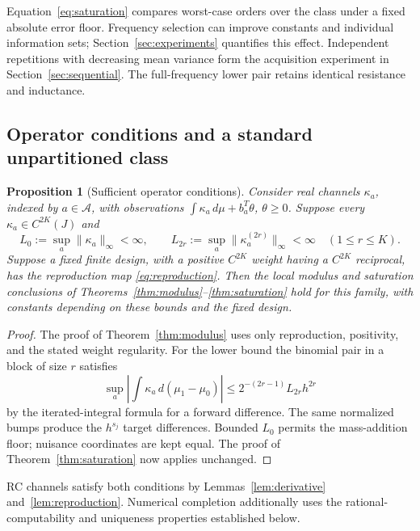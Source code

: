 \documentclass[10pt]{amsart}
\newtheorem{proposition}[theorem]{Proposition}
\theoremstyle{definition}
\theoremstyle{remark}
\theoremstyle{plain}
\newcommand{\dd}{\,d}
\begin{document}
Equation~\eqref{eq:saturation} compares worst-case orders over the class under a fixed absolute error floor. Frequency selection can improve constants and individual information sets; Section~\ref{sec:experiments} quantifies this effect. Independent repetitions with decreasing mean variance form the acquisition experiment in Section~\ref{sec:sequential}. The full-frequency lower pair retains identical resistance and inductance.

\subsection{Operator conditions and a standard unpartitioned class}
\begin{proposition}[Sufficient operator conditions]\label{prop:operator}
Consider real channels $\kappa_a$, indexed by $a\in\mathcal A$, with observations $\int\kappa_a\dd\mu+b_a^T\theta$, $\theta\ge0$. Suppose every $\kappa_a\in C^{2K}(J)$ and
\[
 L_0:=\sup_a\|\kappa_a\|_\infty<\infty,\qquad
 L_{2r}:=\sup_a\|\kappa_a^{(2r)}\|_\infty<\infty\quad(1\le r\le K).
\]
Suppose a fixed finite design, with a positive $C^{2K}$ weight having a $C^{2K}$ reciprocal, has the reproduction map \eqref{eq:reproduction}. Then the local modulus and saturation conclusions of Theorems~\ref{thm:modulus}--\ref{thm:saturation} hold for this family, with constants depending on these bounds and the fixed design.
\end{proposition}
\begin{proof}
The proof of Theorem~\ref{thm:modulus} uses only reproduction, positivity, and the stated weight regularity. For the lower bound the binomial pair in a block of size $r$ satisfies
\[
 \sup_a\left|\int\kappa_a\dd(\mu_1-\mu_0)\right|
 \le 2^{-(2r-1)}L_{2r}h^{2r}
\]
by the iterated-integral formula for a forward difference. The same normalized bumps produce the $h^{s_j}$ target differences. Bounded $L_0$ permits the mass-addition floor; nuisance coordinates are kept equal. The proof of Theorem~\ref{thm:saturation} now applies unchanged.
\end{proof}
RC channels satisfy both conditions by Lemmas~\ref{lem:derivative} and~\ref{lem:reproduction}. Numerical completion additionally uses the rational-computability and uniqueness properties established below.
\end{document}
